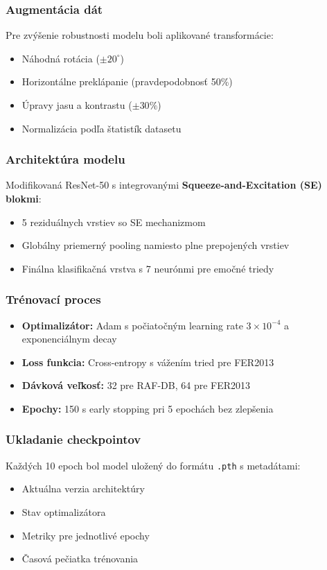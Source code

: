 \subsubsection{Augmentácia dát}
Pre zvýšenie robustnosti modelu boli aplikované transformácie:
\begin{itemize}
    \item Náhodná rotácia ($\pm 20^\circ$)
    \item Horizontálne preklápanie (pravdepodobnosť 50\%)
    \item Úpravy jasu a kontrastu ($\pm 30\%$)
    \item Normalizácia podľa štatistík datasetu
\end{itemize}

\subsubsection{Architektúra modelu}
Modifikovaná ResNet-50 s integrovanými \textbf{Squeeze-and-Excitation (SE) blokmi}:
\begin{itemize}
    \item 5 reziduálnych vrstiev so SE mechanizmom
    \item Globálny priemerný pooling namiesto plne prepojených vrstiev
    \item Finálna klasifikačná vrstva s 7 neurónmi pre emočné triedy
\end{itemize}

\subsubsection{Trénovací proces}
\begin{itemize}
    \item \textbf{Optimalizátor:} Adam s počiatočným learning rate $3 \times 10^{-4}$ a exponenciálnym decay
    \item \textbf{Loss funkcia:} Cross-entropy s vážením tried pre FER2013
    \item \textbf{Dávková veľkosť:} 32 pre RAF-DB, 64 pre FER2013
    \item \textbf{Epochy:} 150 s early stopping pri 5 epochách bez zlepšenia
\end{itemize}

\subsubsection{Ukladanie checkpointov}
Každých 10 epoch bol model uložený do formátu \texttt{.pth} s metadátami:
\begin{itemize}
    \item Aktuálna verzia architektúry
    \item Stav optimalizátora
    \item Metriky pre jednotlivé epochy
    \item Časová pečiatka trénovania
\end{itemize}

